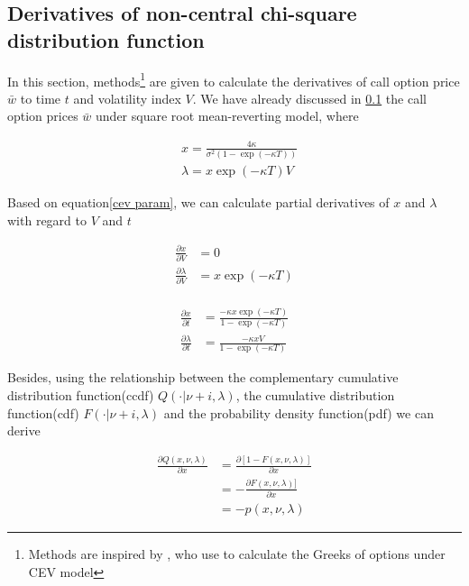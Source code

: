 \subsection{Derivatives of non-central chi-square distribution function}
\label{sec: 3.2}

In this section, methods\footnote{Methods are inspired by \cite{hossain_comparison_2019}, who use to calculate the Greeks of options under CEV model} are given to calculate the derivatives of call option price $\bar{w}$ to time $t$ and volatility index $V$. We have already discussed in \ref{sec: 3.2} the call option prices $\bar{w}$ under square root mean-reverting model, where

\begin{equation}\label{cev param}
    \begin{aligned}
        &x=\frac{4 \kappa}{\sigma^{2}(1-\exp (-\kappa T))} \\
        &\lambda=x \exp (-\kappa T) V
        \end{aligned}
\end{equation}

Based on equation\eqref{cev param}, we can calculate partial derivatives of $x$ and $\lambda$ with regard to $V$ and $t$

\begin{equation}\label{params dv}
    \begin{aligned}
        \frac{\partial x}{\partial V}&=0\\
        \frac{\partial \lambda}{\partial V}&=x \exp (-\kappa T)  \\
    \end{aligned}
\end{equation}

\begin{equation}\label{params dt}
    \begin{aligned}
        \frac{\partial x}{\partial t}&= \frac{-\kappa x \exp(- \kappa T)}{1 - \exp(- \kappa T)}\\
        \frac{\partial \lambda}{\partial t}& =\frac{-\kappa x V }{1 - \exp(- \kappa T)}
    \end{aligned}
\end{equation}

Besides, using the relationship between the complementary cumulative distribution function(ccdf) $Q(\cdot | \nu+i, \lambda)$, the cumulative distribution function(cdf) $F(\cdot | \nu+i, \lambda)$ and the probability density function(pdf) we can derive

\begin{equation}\label{q dx}
    \begin{aligned}
        \frac{\partial Q(x, \nu, \lambda)}{\partial x}&=\frac{\partial[1-F(x, \nu, \lambda)]}{\partial x} \\ 
        &=-\frac{\partial F(x, \nu, \lambda)]}{\partial x} \\
        &=-p(x, \nu, \lambda)
        \end{aligned}
\end{equation}

